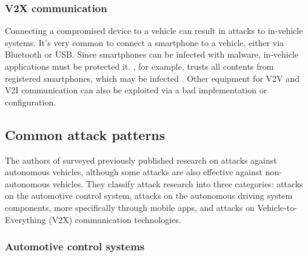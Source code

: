 \subsubsection{V2X communication}

Connecting a compromised device to a vehicle can result in attacks to in-vehicle systems. It's very common to connect a smartphone to a vehicle, either via Bluetooth or USB. Since smartphones can be infected with malware, in-vehicle applications must be protected it. \cite{mirrorlink}, for example, trusts all contents from registered smartphones, which may be infected \citep{mazloom2016security}. Other equipment for V2V and V2I communication can also be exploited via a bad implementation or configuration.

\subsection{Common attack patterns}

The authors of \cite{Kim2021} surveyed previously published research on attacks against autonomous vehicles, although some attacks are also effective against non-autonomous vehicles. They classify attack research into three categories: attacks on the automotive control system, attacks on the autonomous driving system components, more specifically through mobile apps, and attacks on Vehicle-to-Everything (V2X) communication technologies.

\subsubsection{Automotive control systems}

